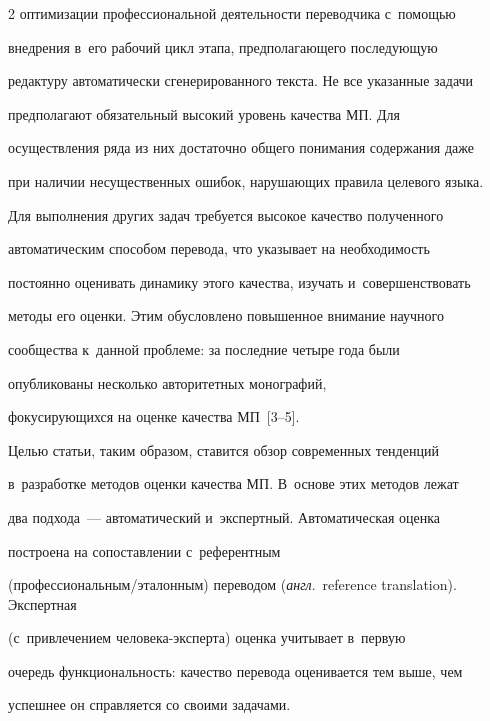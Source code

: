 \begin{multicols}{2}
оптимизации \mbox{профессиональной} деятельности переводчика с~по\-мощью 


внедрения в~его рабочий цикл этапа, предполагающего по\-сле\-ду\-ющую 


редактуру автоматически сгенерированного текста. Не все указанные задачи 


предполагают обязательный высокий уровень качества МП. Для 


осуществления ряда из них достаточно общего понимания содержания даже 


при наличии несущественных ошибок, на\-ру\-ша\-ющих правила целевого языка. 


Для выполнения других задач требуется высокое качество полученного 


автоматическим способом перевода, что указывает на необходимость 


постоянно оценивать динамику этого качества, изучать и~совершенствовать 


методы его оценки. Этим обусловлено повышенное внимание научного 


сообщества к~данной проб\-ле\-ме: за последние четыре года были 


опубликованы несколько авторитетных монографий, 


фо\-ку\-си\-ру\-ющих\-ся на оценке качества МП~[3--5].


  


  Целью статьи, таким образом, ставится обзор современных тенденций 


в~разработке методов оценки качества МП. В~основе этих методов лежат 


два подхода~--- автоматический и~экспертный. Автоматическая оценка 


построена на сопоставлении с~референтным


(про\-фес\-сио\-наль\-ным/эта\-лон\-ным) переводом (\textit{англ}.\ reference translation). Экспертная 


(с~привлечением че\-ло\-ве\-ка-экс\-пер\-та) оценка учитывает в~первую 


очередь функциональность: качество перевода оценивается тем выше, чем 


успешнее он справляется со своими задачами.





\vspace*{-9pt}


  



\end{multicols}
